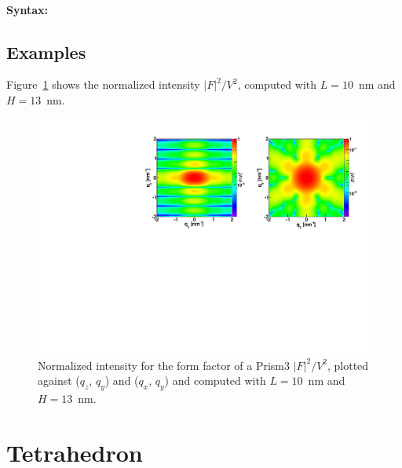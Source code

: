 \paragraph{Syntax:}  

\subsection{Examples}
Figure~\ref{fig:FFprism3Ex} shows the normalized intensity
$|F|^2/V^2$, computed with $L=10$~nm and \mbox{$H=13$~nm.}
\begin{figure}[h]
\begin{center}
\includegraphics[width=\textwidth]{Figures/figffprism3}
\end{center}
\caption{Normalized intensity for the form factor of a Prism3
  $|F|^2/V^2$, plotted against ($q_z$, $q_y$) and  ($q_x$, $q_y$) and
  computed with $L=10$~nm and $H=13$~nm.}
\label{fig:FFprism3Ex}
\end{figure}


\newpage{\cleardoublepage}
\section{Tetrahedron}   
 
